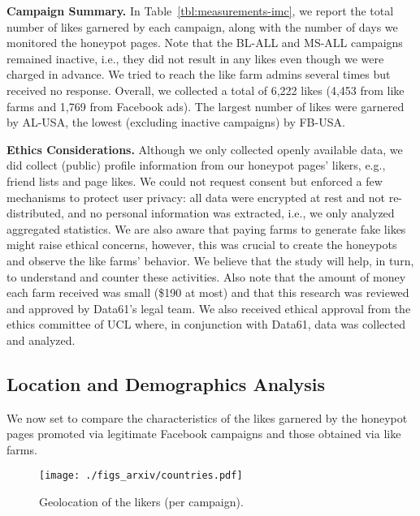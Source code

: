 \documentclass[twocolumn,10pt,letterpaper]{article}
\newcommand{\descr}[1]{\smallskip\noindent\textbf{#1}}
\begin{document}
\descr{Campaign Summary.} In Table~\ref{tbl:measurements-imc}, we report the total number of likes garnered by each campaign, along with the number of days we monitored the honeypot pages. Note that the BL-ALL and MS-ALL campaigns remained inactive, i.e., they did not result in any likes even though we were charged in advance.
We tried to reach the like farm admins several times but received no response. Overall, we collected a total of 6,222 likes (4,453 from like farms and 1,769 from Facebook ads). The largest number of likes were garnered by AL-USA, the lowest (excluding inactive campaigns) by FB-USA.
%

\descr{Ethics Considerations.} Although we only collected openly available data,
we did collect (public) profile information from our honeypot pages' likers, e.g., friend lists and page likes. We could not request consent but enforced a few mechanisms to protect user privacy: all data were encrypted at rest and not re-distributed, and no personal information was extracted, i.e., we only analyzed aggregated statistics.
%
%
We are also aware that paying farms to generate fake likes might raise ethical concerns, however, this was crucial to create the honeypots and observe the like farms' behavior. We believe that the study will help, in turn, to understand and counter these activities. Also note that the amount of money each farm received was small (\$190 at most) and that this research was reviewed and approved by Data61's legal team. We also received ethical approval from the ethics committee of UCL where, in conjunction with Data61, data was collected and analyzed.




%
%
%
%
%

\subsection{Location and Demographics Analysis}
\label{sec:demographics}
%
We now set to compare the characteristics of the likes garnered by the honeypot pages promoted via legitimate Facebook campaigns and those obtained via like farms.


\begin{figure}[t!]
\centering
\texttt{[image: ./figs\_arxiv/countries.pdf]}
\vspace{-0.15cm}
\caption{Geolocation of the likers (per campaign). }
\label{fig:geolocation}
\end{figure}
\end{document}
